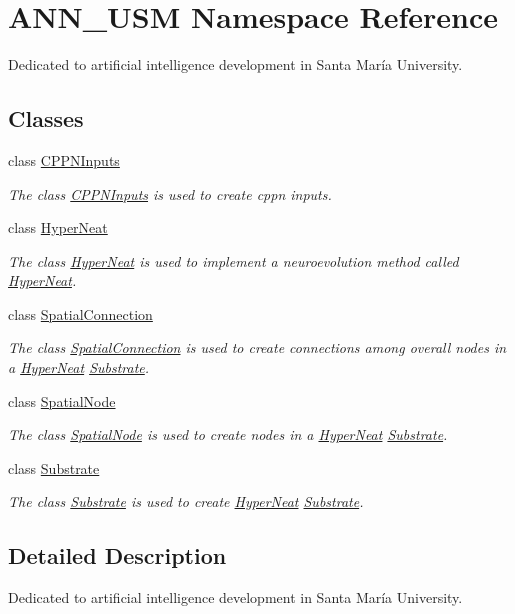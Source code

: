 \hypertarget{namespace_a_n_n___u_s_m}{\section{A\-N\-N\-\_\-\-U\-S\-M Namespace Reference}
\label{namespace_a_n_n___u_s_m}
}


Dedicated to artificial intelligence development in Santa María University.  


\subsection*{Classes}
\begin{DoxyCompactItemize}
\item 
class \hyperlink{class_a_n_n___u_s_m_1_1_c_p_p_n_inputs}{C\-P\-P\-N\-Inputs}
\begin{DoxyCompactList}\small\item\em The class \hyperlink{class_a_n_n___u_s_m_1_1_c_p_p_n_inputs}{C\-P\-P\-N\-Inputs} is used to create cppn inputs. \end{DoxyCompactList}\item 
class \hyperlink{class_a_n_n___u_s_m_1_1_hyper_neat}{Hyper\-Neat}
\begin{DoxyCompactList}\small\item\em The class \hyperlink{class_a_n_n___u_s_m_1_1_hyper_neat}{Hyper\-Neat} is used to implement a neuroevolution method called \hyperlink{class_a_n_n___u_s_m_1_1_hyper_neat}{Hyper\-Neat}. \end{DoxyCompactList}\item 
class \hyperlink{class_a_n_n___u_s_m_1_1_spatial_connection}{Spatial\-Connection}
\begin{DoxyCompactList}\small\item\em The class \hyperlink{class_a_n_n___u_s_m_1_1_spatial_connection}{Spatial\-Connection} is used to create connections among overall nodes in a \hyperlink{class_a_n_n___u_s_m_1_1_hyper_neat}{Hyper\-Neat} \hyperlink{class_a_n_n___u_s_m_1_1_substrate}{Substrate}. \end{DoxyCompactList}\item 
class \hyperlink{class_a_n_n___u_s_m_1_1_spatial_node}{Spatial\-Node}
\begin{DoxyCompactList}\small\item\em The class \hyperlink{class_a_n_n___u_s_m_1_1_spatial_node}{Spatial\-Node} is used to create nodes in a \hyperlink{class_a_n_n___u_s_m_1_1_hyper_neat}{Hyper\-Neat} \hyperlink{class_a_n_n___u_s_m_1_1_substrate}{Substrate}. \end{DoxyCompactList}\item 
class \hyperlink{class_a_n_n___u_s_m_1_1_substrate}{Substrate}
\begin{DoxyCompactList}\small\item\em The class \hyperlink{class_a_n_n___u_s_m_1_1_substrate}{Substrate} is used to create \hyperlink{class_a_n_n___u_s_m_1_1_hyper_neat}{Hyper\-Neat} \hyperlink{class_a_n_n___u_s_m_1_1_substrate}{Substrate}. \end{DoxyCompactList}\end{DoxyCompactItemize}


\subsection{Detailed Description}
Dedicated to artificial intelligence development in Santa María University. 